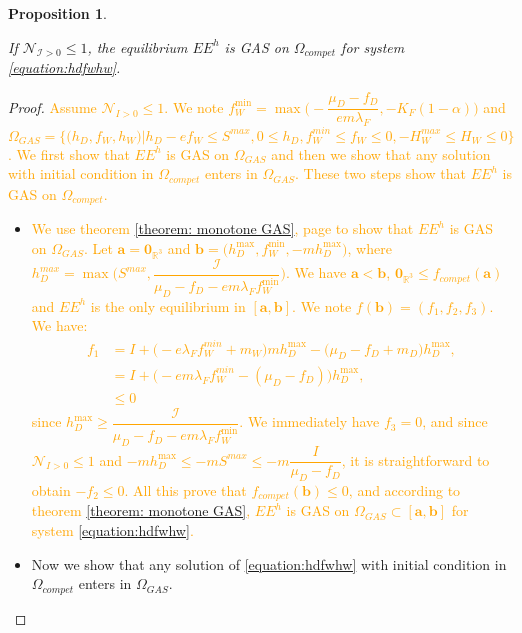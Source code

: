 \documentclass{article}
\newcommand{\lfw}{\lambda_{F}}
\newcommand{\lfw}{\lambda_{F}}
\newcommand{\cI}{\mathcal{I}}
\newcommand{\R}{\mathbb{R}}
\newcommand{\N}{\mathcal{N}}
\newcommand{\vdeux}[1]{\textcolor{orange}{#1}}
\newcommand{\vtrois}[1]{\textcolor{OliveGreen}{#1}}
\newtheorem{prop}[theorem]{Proposition}
\theoremstyle{definition}
\theoremstyle{remark}
\begin{document}





\begin{prop}\label{prop:EEHGAS}

If $\mathcal{N}_{\cI > 0} \leq 1$, the equilibrium $EE^{h}$ is GAS on $\Omega_{compet}$ for system \eqref{equation:hdfwhw}.
\end{prop}


\begin{proof}
\vdeux{
Assume $\N_{I> 0} \leq 1$.
We note $f_W^{\min} = \max\Big(-\dfrac{\mu_D - f_D}{e m \lfw}, -K_F(1-\alpha)\Big)$ and $\Omega_{GAS}=\Big\{\Big(h_D, f_W, h_W \Big)  \Big|h_D - ef_W \leq S^{max}, 0 \leq h_D,  f_W^{min} \leq f_W \leq 0, -H_W^{max}\leq  H_W \leq 0 \Big\}$. We first show that $EE^{h}$ is GAS on $\Omega_{GAS}$ and then we show that any solution with initial condition in $\Omega_{compet}$ enters in $ \Omega_{GAS}$. These two steps show that $EE^{h}$ is GAS on $\Omega_{compet}$.}
\begin{itemize}
\item \vdeux{ We use theorem \ref{theorem: monotone GAS}, page \pageref{theorem: monotone GAS} to show that $EE^{h}$ is GAS on $\Omega_{GAS}$. Let $\mathbf{a} = \mathbf{0}_{\R^3}$ and $\mathbf{b} = \Big(h_D^{\max}, f_W^{\min}, -mh_D^{\max} \Big)$, where $h_D^{max} = \max\Big(S^{max}, \dfrac{\cI}{\mu_D - f_D - e m \lfw f^{\min}_W}\Big)$. We have $\mathbf{a} < \mathbf{b}$, $\mathbf{0}_{\R^3} \leq f_{compet}(\mathbf{a})$ and $EE^{h}$ is the only equilibrium in $[\mathbf{a}, \mathbf{b}]$. We note $f(\mathbf{b}) = (f_1, f_2, f_3)$. We have:
\begin{align*}
f_1 &= I + \Big(-e\lfw f_W^{min} + m_W\Big)mh_D^{\max} - \Big(\mu_D - f_D + m_D\Big) h_D^{\max}, \\
&= I + \Big(-e m \lfw f_W^{min} - (\mu_D - f_D) \Big)h_D^{\max}, \\
& \leq 0
\end{align*}
since $h_D^{\max} \geq \dfrac{\cI}{\mu_D - f_D - e m \lfw f^{\min}_W}$. We immediately have $f_3 = 0$, and since $\N_{I>0} \leq 1$ and $-m h_D^{\max} \leq -mS^{max} \leq -m\dfrac{I}{\mu_D -f_D}$, it is straightforward to obtain $-f_2 \leq 0$. All this prove that $f_{compet}(\mathbf{b}) \leq 0$, and according to theorem \ref{theorem: monotone GAS}, $EE^{h}$ is GAS on $ \Omega_{GAS} \subset [\mathbf{a}, \mathbf{b}]$ for system \eqref{equation:hdfwhw}.}
\item \vtrois{ Now we show that any solution of \eqref{equation:hdfwhw} with initial condition in $\Omega_{compet}$ enters in $\Omega_{GAS}$. 
}
\end{itemize}
\end{proof}
\end{document}
